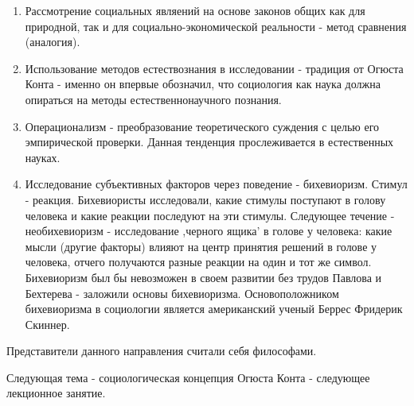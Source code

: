 \documentclass{article}
\begin{document}
\begin{enumerate}
    \item Рассмотрение социальных являений на основе законов общих как для природной, так и для социально-экономической реальности - метод сравнения (аналогия).
    \item Использование методов естествознания в исследовании - традиция от Огюста Конта - именно он впервые обозначил, что социология как наука должна опираться на методы естественнонаучного познания.
    \item Операционализм - преобразование теоретического суждения с целью его эмпирической проверки. Данная тенденция прослеживается в естественных науках.
    \item Исследование субъективных факторов через поведение - бихевиоризм. Стимул - реакция. Бихевиористы исследовали, какие стимулы поступают в голову человека и какие реакции последуют на эти стимулы. Следующее течение - необихевиоризм - исследование ,черного ящика' в голове у человека: какие мысли (другие факторы) влияют на центр принятия решений в голове у человека, отчего получаются разные реакции на один и тот же символ. Бихевиоризм был бы невозможен в своем развитии без трудов Павлова и Бехтерева - заложили основы бихевиоризма. Основоположником бихевиоризма в социологии является американский ученый Беррес Фридерик Скиннер.
\end{enumerate}

Представители данного направления считали себя философами.

Следующая тема - социологическая концепция Огюста Конта - следующее лекционное занятие.
\end{document}
